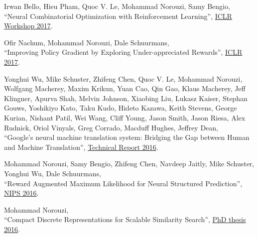 \documentclass[10pt,letterpaper]{article}
\renewenvironment{itemize}{
  \begin{list}{}{
    \setlength{\leftmargin}{1.5em}
  }
}{
  \end{list}
}
\begin{document}
\begin{itemize}

\item Irwan Bello, Hieu Pham, Quoc V. Le, Mohammad Norouzi, Samy Bengio,\\
``Neural Combinatorial Optimization with Reinforcement Learning'',
\href{https://arxiv.org/pdf/1611.09940}%
{ICLR Workshop 2017}.

\item Ofir Nachum, Mohammad Norouzi, Dale Schuurmans,\\
``Improving Policy Gradient by Exploring Under-appreciated Rewards'',
\href{https://arxiv.org/pdf/1611.09321}{ICLR 2017}.

\item Yonghui Wu, Mike Schuster, Zhifeng Chen, Quoc V. Le, Mohammad Norouzi, Wolfgang Macherey, Maxim Krikun, Yuan Cao, Qin Gao, Klaus Macherey, Jeff Klingner, Apurva Shah, Melvin Johnson, Xiaobing Liu, Lukasz Kaiser, Stephan Gouws, Yoshikiyo Kato, Taku Kudo, Hideto Kazawa, Keith Stevens, George Kurian, Nishant Patil, Wei Wang, Cliff Young, Jason Smith, Jason Riesa, Alex Rudnick, Oriol Vinyals, Greg Corrado, Macduff Hughes, Jeffrey Dean,\\
``Google's neural machine translation system: Bridging the Gap between Human and Machine Translation'',
\href{https://arxiv.org/pdf/1609.08144}%
{Technical Report 2016}.
  
\item
Mohammad Norouzi, Samy Bengio, Zhifeng Chen, Navdeep Jaitly, Mike Schuster, Yonghui Wu, Dale Schuurmans,\\
``Reward Augmented Maximum Likelihood for Neural Structured Prediction'',
\href{https://arxiv.org/pdf/1609.00150.pdf}%
{NIPS 2016}.

\item
  Mohammad Norouzi,\\
  ``Compact Discrete Representations for Scalable Similarity Search'',
\href{https://tspace.library.utoronto.ca/bitstream/1807/73095/3/Norouzi_Mohammad_201606_PhD_thesis.pdf}{PhD thesis 2016}.


\end{itemize}
\end{document}
